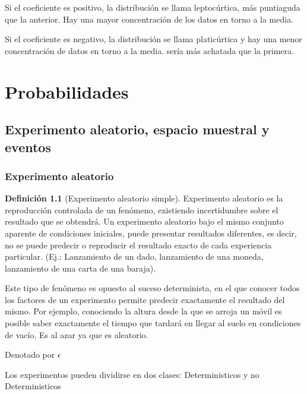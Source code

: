 \documentclass[
  11pt,
]{krantz}
\theoremstyle{definition}
\newtheorem{definition}{Definición}[chapter]
\theoremstyle{definition}
\theoremstyle{definition}
\theoremstyle{definition}
\theoremstyle{remark}
\begin{document}
Si el coeficiente es positivo, la distribución se llama leptocúrtica, más puntiaguda que la anterior. Hay una mayor concentración de los datos en torno a la media.

Si el coeficiente es negativo, la distribución se llama platicúrtica y hay una menor concentración de datos en torno a la media. sería más achatada que la primera.

\hypertarget{part-probabilidades}{%
\part{Probabilidades}\label{part-probabilidades}}

\hypertarget{experimento-aleatorio-espacio-muestral-y-eventos}{%
\chapter{Experimento aleatorio, espacio muestral y eventos}\label{experimento-aleatorio-espacio-muestral-y-eventos}}

\hypertarget{experimento-aleatorio}{%
\section{Experimento aleatorio}\label{experimento-aleatorio}}

\begin{definition}[Experimento aleatorio simple]
\protect\hypertarget{def:www}{}\label{def:www}Experimento aleatorio es la reproducción controlada de un fenómeno, existiendo incertidumbre sobre el resultado que se obtendrá. Un experimento aleatorio bajo el mismo conjunto aparente de condiciones iniciales, puede presentar resultados diferentes, es decir, no se puede predecir o reproducir el resultado exacto de cada experiencia particular. (Ej.: Lanzamiento de un dado, lanzamiento de una moneda, lanzamiento de una carta de una baraja).

Este tipo de fenómeno es opuesto al suceso determinista, en el que conocer todos los factores de un experimento permite predecir exactamente el resultado del mismo. Por ejemplo, conociendo la altura desde la que se arroja un móvil es posible saber exactamente el tiempo que tardará en llegar al suelo en condiciones de vacío. Es al azar ya que es aleatorio.

Denotado por \(\epsilon\)
\end{definition}

Los experimentos pueden dividirse en dos clases: Deterministicos y no Deterministicos
\end{document}
